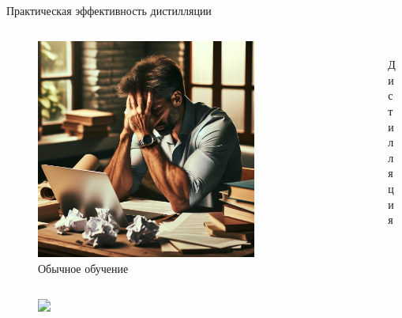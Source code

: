 \documentclass[9pt]{beamer}
\begin{document}
\begin{frame}{Практическая эффективность дистилляции~\cite{sanh2020distilbert}}

    \begin{columns}
        \begin{column}{0.5\textwidth}
            \begin{figure}
                \centering
                \includegraphics[width=0.8\textwidth]{images/image10.png}
                \caption{Обычное обучение}
            \end{figure}
        \end{column}

        \begin{column}{0.5\textwidth}
            \begin{figure}
                \centering
                \includegraphics<2->[width=0.8\textwidth]{images/image11.png}
                \caption{Дистилляция}
            \end{figure}
        \end{column}
    \end{columns}

    \begin{figure}
        \centering
        \includegraphics<3->[width=0.7\textwidth]{images/image7.jpg}
    \end{figure}
\end{frame}
\end{document}
